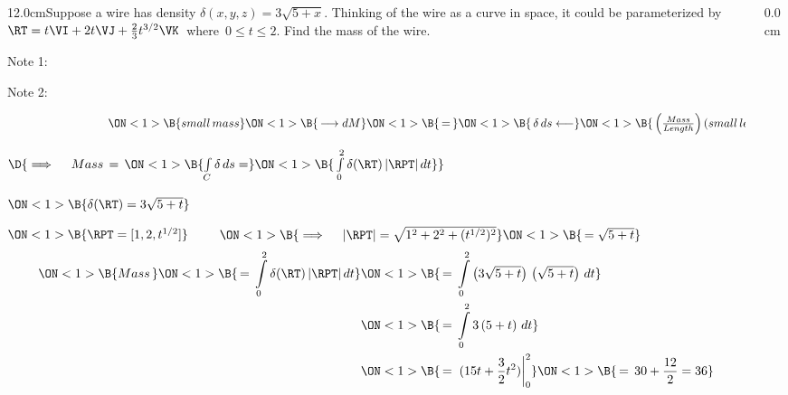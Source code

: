 \begin{frame}
\frametitle{}
\scriptsize
\begin{columns}\begin{column}{12.0cm}\EX Suppose a wire has density $\delta(x,y,z) = 3\sqrt{5+x}$.  Thinking of the wire as a curve in space, it could be parameterized by $\RT = t\VI + 2t\VJ + \frac{2}{3}t^{3/2}\VK$ \,where\, $0 \le t \le 2$. Find the mass of the wire.

Note 1: 


Note 2: 

\vspace{0.2cm}

$\hspace{3.0cm} 
\ON<1>{\B{small \, mass}} 
\ON<1>{\B{\, \longrightarrow dM }}
\ON<1>{\B{\, = \, }}
\ON<1>{\B{\,\delta \, ds \longleftarrow }}
\ON<1>{\B{\, \left(\frac{Mass}{Length}\right) (small \, length)}}$

\vspace{0.2cm}

$\D{\implies \quad Mass \, = \, 
\ON<1>{\B{\int \limits_C \delta \, ds = }}
\ON<1>{\B{\, \int \limits_{0}^{2} \delta(\RT) \, |\RPT|\, dt}}}$

\vspace{0.2cm}
	
	$ 
	\ON<1>{\B{\delta(\RT) = 3\sqrt{5+t}}}$
	
	\vspace{0.2cm}
	
	$ 
	\ON<1>{\B{\RPT = [1,2,t^{1/2}]}}$
	$\qquad   
	\ON<1>{\B{\implies \quad |\RPT| = \sqrt{1^2 + 2^2 + (t^{1/2})^2}}}
	\ON<1>{\B{\, = \sqrt{5 + t}}}$
	\begin{align*}
		\ON<1>{\B{Mass \, }}  
			 \ON<1>{\B{\, = \, \int \limits_{0}^{2} \delta(\RT) \, |\RPT|\, dt}}
			& \ON<1>{\B{\, = \, \int \limits_{0}^{2} \left(3\sqrt{5+t}\right) \, \left(\sqrt{5+t}\right)\, dt}} \\
			& \ON<1>{\B{\, = \, \int \limits_{0}^{2} 3 \left(5+t\right)\, dt}}  \\
			& \ON<1>{\B{\, = \, \left.(15t + \frac{3}{2}t^2) \right|_{0}^{2}}}
			  \ON<1>{\B{\, = \, 30 + \frac{12}{2} = 36}}   \\
	\end{align*}
	

\end{column}\begin{column}{0.0cm}\end{column}\end{columns}
\end{frame}


